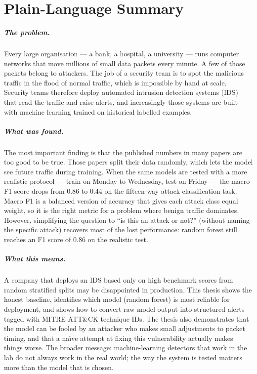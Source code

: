 \chapter*{Plain-Language Summary}

\paragraph{The problem.}
Every large organisation --- a bank, a hospital, a university --- runs
computer networks that move millions of small data packets every minute. A
few of those packets belong to attackers. The job of a security team is to
spot the malicious traffic in the flood of normal traffic, which is
impossible by hand at scale. Security teams therefore deploy automated
intrusion detection systems (IDS) that read the traffic and raise alerts,
and increasingly those systems are built with machine learning trained on
historical labelled examples.

\paragraph{What was found.}
The most important finding is that the published numbers in many papers
are too good to be true. Those papers split their data randomly, which
lets the model see future traffic during training. When the same models
are tested with a more realistic protocol --- train on Monday to Wednesday,
test on Friday --- the macro F1 score drops from 0.86 to 0.44 on the
fifteen-way attack classification task. Macro F1 is a balanced version of
accuracy that gives each attack class equal weight, so it is the right
metric for a problem where benign traffic dominates. However, simplifying
the question to ``is this an attack or not?'' (without naming the specific
attack) recovers most of the lost performance: random forest still reaches
an F1 score of 0.86 on the realistic test.

\paragraph{What this means.}
A company that deploys an IDS based only on high benchmark scores from
random stratified splits may be disappointed in production. This thesis
shows the honest baseline, identifies which model (random forest) is most
reliable for deployment, and shows how to convert raw model output into
structured alerts tagged with MITRE ATT\&CK technique IDs. The thesis
also demonstrates that the model can be fooled by an attacker who makes
small adjustments to packet timing, and that a naïve attempt at fixing
this vulnerability actually makes things worse. The broader message:
machine-learning detectors that work in the lab do not always work in the
real world; the way the system is tested matters more than the model that
is chosen.
